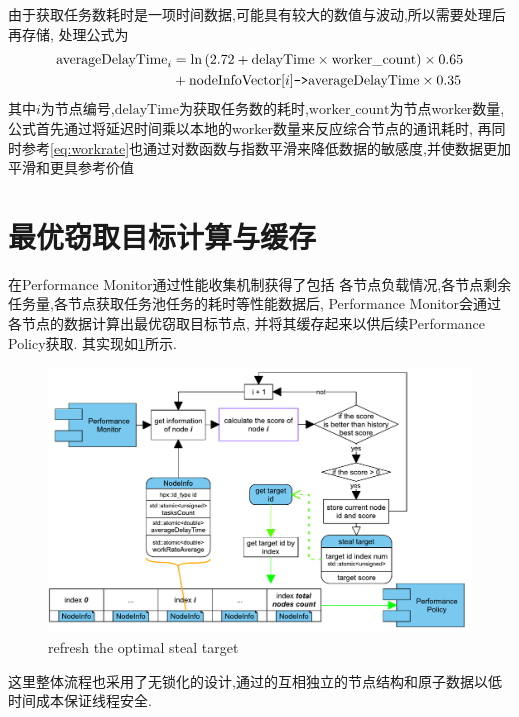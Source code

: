 \documentclass{mproj}
\begin{document}
由于获取任务数耗时是一项时间数据,可能具有较大的数值与波动,所以需要处理后再存储,
处理公式为
\begin{align}
    \text{averageDelayTime}_i & = \ln\left(2.72 + \text{delayTime} \times \text{worker\_count}\right) \times 0.65 \notag               \\
                              & + \text{nodeInfoVector}[i]\texttt{->}\text{averageDelayTime} \times 0.35   \label{eq:averageDelayTime}
\end{align}
其中$i$为节点编号,$\text{delayTime}$为获取任务数的耗时,$\text{worker\_count}$为节点worker数量,
公式首先通过将延迟时间乘以本地的worker数量来反应综合节点的通讯耗时,
再同时参考\cref{eq:workrate}也通过对数函数与指数平滑来降低数据的敏感度,并使数据更加平滑和更具参考价值

\section{最优窃取目标计算与缓存}

在Performance Monitor通过性能收集机制获得了包括
各节点负载情况,各节点剩余任务量,各节点获取任务池任务的耗时等性能数据后,
Performance Monitor会通过各节点的数据计算出最优窃取目标节点,
并将其缓存起来以供后续Performance Policy获取.
其实现如\cref{fig:refresh_target}所示.

\begin{figure}[h]
    \centering %
    \includegraphics[width=1\textwidth]{images/refresh_target.pdf} %
    \caption{refresh the optimal steal target} %
    \label{fig:refresh_target} %
\end{figure}
\FloatBarrier

这里整体流程也采用了无锁化的设计,通过的互相独立的节点结构和原子数据以低时间成本保证线程安全.
\end{document}
